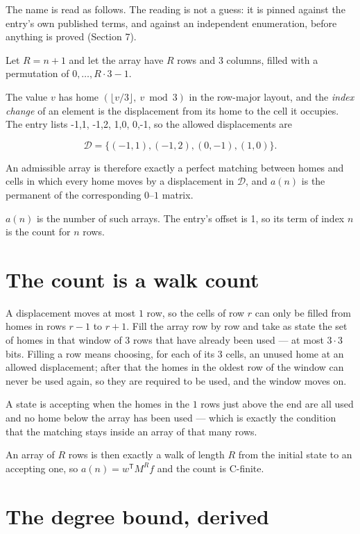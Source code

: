 \documentclass[11pt]{article}
\theoremstyle{definition}
\begin{document}
The name is read as follows. The reading is not a guess: it is pinned against the entry's own published terms, and against an independent enumeration, before anything is proved (Section 7).

Let $R = n + 1$ and let the array have $R$ rows and $3$ columns, filled with a permutation of $0,\dots,R\cdot3-1$.

The value $v$ has home $(\lfloor v/3\rfloor,\ v \bmod 3)$ in the row-major layout, and the {\itshape index change} of an element is the displacement from its home to the cell it occupies. The entry lists -1,1, -1,2, 1,0, 0,-1, so the allowed displacements are

\[\mathcal{D} = \{(-1,1), (-1,2), (0,-1), (1,0)\}.\]

An admissible array is therefore exactly a perfect matching between homes and cells in which every home moves by a displacement in $\mathcal{D}$, and $a(n)$ is the permanent of the corresponding $0$--$1$ matrix.

$a(n)$ is the number of such arrays. The entry's offset is 1, so its term of index $n$ is the count for $n$ rows.

\section{The count is a walk count}

A displacement moves at most $1$ row, so the cells of row $r$ can only be filled from homes in rows $r-1$ to $r+1$. Fill the array row by row and take as state the set of homes in that window of $3$ rows that have already been used --- at most $3\cdot3$ bits. Filling a row means choosing, for each of its $3$ cells, an unused home at an allowed displacement; after that the homes in the oldest row of the window can never be used again, so they are required to be used, and the window moves on.

A state is accepting when the homes in the $1$ rows just above the end are all used and no home below the array has been used --- which is exactly the condition that the matching stays inside an array of that many rows.

An array of $R$ rows is then exactly a walk of length $R$ from the initial state to an accepting one, so $a(n) = w^{\mathsf T}M^{R}f$ and the count is C-finite.

\section{The degree bound, derived}
\end{document}

